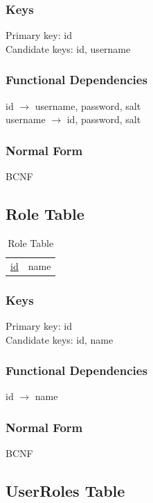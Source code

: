 \documentclass[11pt]{article}
\begin{document}
\subsubsection{Keys}
\label{sec-3-1-1}

    
    Primary key: id\\
    Candidate keys: id, username\\
\subsubsection{Functional Dependencies}
\label{sec-3-1-2}


    id $\rightarrow$ username, password, salt\\
    username $\rightarrow$ id, password, salt
\subsubsection{Normal Form}
\label{sec-3-1-3}


    BCNF
\subsection{Role Table}
\label{sec-3-2}


\begin{table}[htb]
\caption{Role Table} 
\begin{center}
\begin{tabular}{l|l}
 \underline{id}  &  name  \\
\end{tabular}
\end{center}
\end{table}
\subsubsection{Keys}
\label{sec-3-2-1}

    
    Primary key: id\\
    Candidate keys: id, name
\subsubsection{Functional Dependencies}
\label{sec-3-2-2}


    id $\rightarrow$ name
\subsubsection{Normal Form}
\label{sec-3-2-3}


    BCNF
\subsection{UserRoles Table}
\label{sec-3-3}
\end{document}

